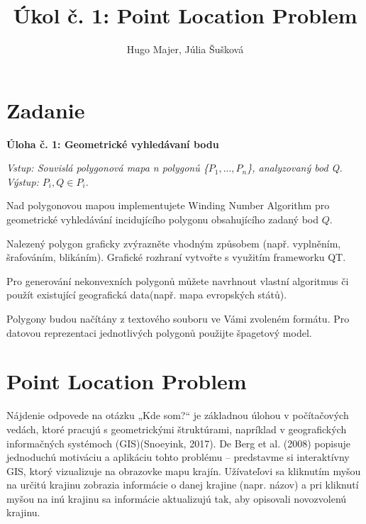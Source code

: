 \documentclass[11pt]{article}
\title{\textbf{Úkol č. 1: Point Location Problem}}
\author{Hugo Majer, Júlia Šušková}
\begin{document}
\maketitle

\newpage
{}
\section{Zadanie}

\textbf{Úloha č. 1: Geometrické vyhledávaní bodu}

\textit{Vstup: Souvislá polygonová mapa n polygonů \{$P_1, ..., P_n$\}, analyzovaný bod Q.}\\
\textit{Výstup: $P_i, Q \in P_i$.}

Nad polygonovou mapou implementujete Winding Number Algorithm pro geometrické vyhledávání incidujícího polygonu obsahujícího zadaný bod $Q$.

Nalezený polygon graficky zvýrazněte vhodným způsobem (např. vyplněním, šrafováním, blikáním). Grafické rozhraní vytvořte s využitím frameworku QT.

Pro generování nekonvexních polygonů můžete navrhnout vlastní algoritmus či použít existující geografická data(např. mapa evropských států).

Polygony budou načítány z textového souboru ve Vámi zvoleném formátu. Pro datovou reprezentaci jednotlivých
polygonů použijte špagetový model.

\newpage
\setlength{\parindent}{1cm}


\section{Point Location Problem} \label{plp}

Nájdenie odpovede na otázku „Kde som?“ je základnou úlohou v počítačových vedách, ktoré pracujú s geometrickými štruktúrami, napríklad v geografických informačných systémoch (GIS)\linebreak (Snoeyink, 2017). De Berg et al. (2008) popisuje jednoduchú motiváciu a aplikáciu tohto \linebreak problému -- predstavme si interaktívny GIS, ktorý vizualizuje na obrazovke mapu krajín. Užívateľovi sa kliknutím myšou na určitú krajinu zobrazia informácie o danej krajine (napr. názov) a pri kliknutí myšou na inú krajinu sa informácie aktualizujú tak, aby opisovali novozvolenú krajinu.
\end{document}

